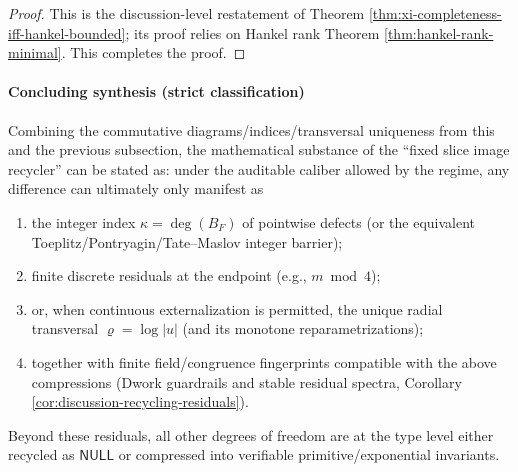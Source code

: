 \begin{proof}
This is the discussion-level restatement of Theorem \ref{thm:xi-completeness-iff-hankel-bounded}; its proof relies on Hankel rank Theorem \ref{thm:hankel-rank-minimal}. This completes the proof.
\end{proof}

\paragraph{Concluding synthesis (strict classification)}
Combining the commutative diagrams/indices/transversal uniqueness from this and the previous subsection, the mathematical substance of the ``fixed slice image recycler'' can be stated as: under the auditable caliber allowed by the regime, any difference can ultimately only manifest as
\begin{enumerate}
  \item the integer index \(\kappa=\deg(B_F)\) of pointwise defects (or the equivalent Toeplitz/Pontryagin/Tate--Maslov integer barrier);
  \item finite discrete residuals at the endpoint (e.g., \(m\bmod 4\));
  \item or, when continuous externalization is permitted, the unique radial transversal \(\varrho=\log|u|\) (and its monotone reparametrizations);
  \item together with finite field/congruence fingerprints compatible with the above compressions (Dwork guardrails and stable residual spectra, Corollary \ref{cor:discussion-recycling-residuals}).
\end{enumerate}
Beyond these residuals, all other degrees of freedom are at the type level either recycled as \(\mathsf{NULL}\) or compressed into verifiable primitive/exponential invariants.

\endinput
